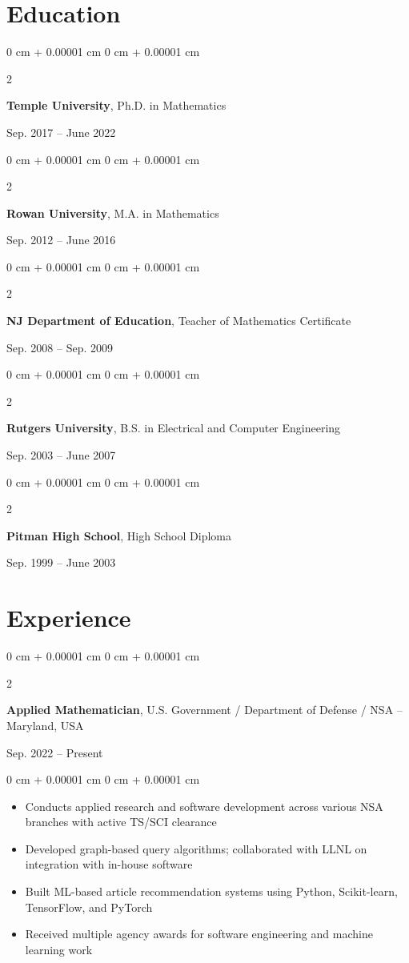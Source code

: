 \documentclass[10pt, letterpaper]{article}
\newenvironment{highlights}{
    \begin{itemize}[
        topsep=0.10 cm,
        parsep=0.10 cm,
        partopsep=0pt,
        itemsep=0pt,
        leftmargin=0 cm + 10pt
    ]
}{
    \end{itemize}
} %
\newenvironment{onecolentry}{
    \begin{adjustwidth}{
        0 cm + 0.00001 cm
    }{
        0 cm + 0.00001 cm
    }
}{
    \end{adjustwidth}
} %
\newenvironment{twocolentry}[2][]{
    \onecolentry
    \def\secondColumn{#2}
    \setcolumnwidth{\fill, 4.5 cm}
    \begin{paracol}{2}
}{
    \switchcolumn \raggedleft \secondColumn
    \end{paracol}
    \endonecolentry
} %
\begin{document}
\section{Education}
    \begin{twocolentry}{Sep. 2017 – June 2022}
        \textbf{Temple University}, Ph.D. in Mathematics
    \end{twocolentry}
    \vspace{0.1 cm}
    \begin{twocolentry}{Sep. 2012 – June 2016}
        \textbf{Rowan University}, M.A. in Mathematics
    \end{twocolentry}
    \vspace{0.1 cm}
    \begin{twocolentry}{Sep. 2008 – Sep. 2009}
        \textbf{NJ Department of Education}, Teacher of Mathematics Certificate
    \end{twocolentry}
    \vspace{0.1 cm}
    \begin{twocolentry}{Sep. 2003 – June 2007}
        \textbf{Rutgers University}, B.S. in Electrical and Computer Engineering
    \end{twocolentry}
    \vspace{0.1 cm}
    \begin{twocolentry}{Sep. 1999 – June 2003}
        \textbf{Pitman High School}, High School Diploma
    \end{twocolentry}

   \section{Experience}

\begin{twocolentry}{
    Sep. 2022 – Present
}
    \textbf{Applied Mathematician}, U.S. Government / Department of Defense / NSA -- Maryland, USA
\end{twocolentry}

\vspace{0.10 cm}
\begin{onecolentry}
    \begin{highlights}
        \item Conducts applied research and software development across various NSA branches with active TS/SCI clearance
        \item Developed graph-based query algorithms; collaborated with LLNL on integration with in-house software
        \item Built ML-based article recommendation systems using Python, Scikit-learn, TensorFlow, and PyTorch
        \item Received multiple agency awards for software engineering and machine learning work
    \end{highlights}
\end{onecolentry}
\end{document}
